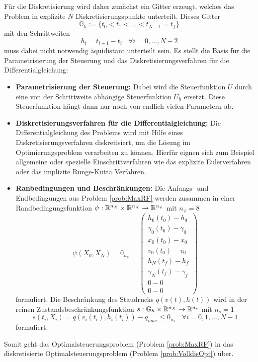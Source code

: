 Für die Diskretisierung wird daher zunächst ein Gitter erzeugt, welches das Problem in explizite $N$ Diskretisierungspunkte unterteilt. Dieses Gitter 
\[\mathbb{G}_h := \lbrace t_0 < t_1 < ... < t_{N-1} = t_f \rbrace\]
mit den Schrittweiten 
\[h_i = t_{i+1} - t_i \ \ \ \ \forall i = 0,...,N-2\]
muss dabei nicht notwendig äquidistant unterteilt sein. Es stellt die Basis für die Parametrisierung der Steuerung und das Diskretisierungsverfahren für die Differentialgleichung:
\begin{itemize}
\item \textbf{Parametrisierung der Steuerung:} Dabei wird die Steuerfunktion $U$ durch eine von der Schrittweite abhängige Steuerfunktion $U_h$ ersetzt. Diese Steuerfunktion hängt dann nur noch von endlich vielen Parametern ab.
%
\item \textbf{Diskretisierungsverfahren für die Differentialgleichung:} Die Differentialgleichung des Problems wird mit Hilfe eines Diskretisierungsverfahren diskretisiert, um die Lösung im Optimierungsproblem verarbeiten zu können. Hierfür eignen sich zum Beispiel allgemeine oder spezielle Einschrittverfahren wie das explizite Eulerverfahren oder das implizite Runge-Kutta Verfahren.
%
\item \textbf{Ranbedingungen und Beschränkungen:} Die Anfangs- und Endbedingungen aus Problem \ref{prob:MaxRF} werden zusammen in einer Randbedingungsfunktion $\psi : \mathbb{R}^{n_X} \times \mathbb{R}^{n_X} \to \mathbb{R}^{n_{\psi}}$ mit $n_{\psi} = 8$
\[\psi(X_0,X_N) = 0_{n_{\psi}} = \begin{pmatrix}
h_0(t_0) - h_0 \\ 
\gamma_0(t_0) - \gamma_0 \\
x_0(t_0) - x_0 \\ 
v_0(t_0) - v_0 \\ 
h_N(t_f) - h_f \\ 
\gamma_N(t_f) - \gamma_f \\
0 - 0 \\ 
0 - 0
\end{pmatrix}\] formuliert. Die Beschränkung des Staudrucks $q(v(t),h(t))$ wird in der reinen Zustandsbeschränkungsfunktion $s : \mathbb{G}_h \times \mathbb{R}^{n_X} \to \mathbb{R}^{n_s}$ mit $n_s = 1$
\[s(t_i,X_i) = q(v_i(t_i),h_i(t_i)) - q_{max} \leq 0_{n_s} \ \ \ \ \forall i = 0,1,...,N-1\] formuliert.
\end{itemize}
Somit geht das Optimalsteuerungsproblem (Problem \ref{prob:MaxRF}) in das diskretisierte Optimalsteuerungsproblem (Problem \ref{prob:VolldisOpt}) über.

